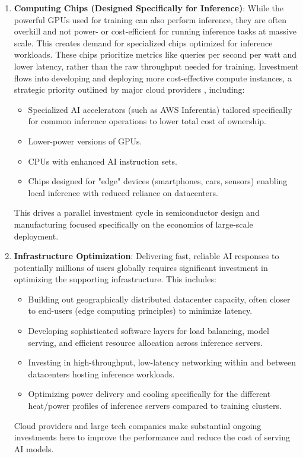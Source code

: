 \begin{enumerate}
    \item \textbf{Computing Chips (Designed Specifically for Inference)}: While the powerful GPUs used for training can also perform inference, they are often overkill and not power- or cost-efficient for running inference tasks at massive scale. This creates demand for specialized chips optimized for inference workloads. These chips prioritize metrics like queries per second per watt and lower latency, rather than the raw throughput needed for training. Investment flows into developing and deploying more cost-effective compute instances, a strategic priority outlined by major cloud providers \parencite{amazon202410k}, including:
          \begin{itemize}
              \item Specialized AI accelerators
                    (such as AWS Inferentia) tailored specifically for common inference operations to lower total cost of ownership.
              \item Lower-power versions of GPUs.
              \item CPUs with enhanced AI instruction sets.
              \item Chips designed for "edge" devices (smartphones, cars, sensors) enabling local inference with reduced reliance on datacenters.
          \end{itemize}
          This drives a parallel investment cycle in semiconductor design and manufacturing focused specifically on the economics of large-scale deployment.

    \item \textbf{Infrastructure Optimization}: Delivering fast, reliable AI responses to potentially millions of users globally requires significant investment in optimizing the supporting infrastructure. This includes:
          \begin{itemize}
              \item Building out geographically distributed datacenter capacity, often closer to end-users (edge computing principles) to minimize latency.
              \item Developing sophisticated software layers for load balancing, model serving, and efficient resource allocation across inference servers.
              \item Investing in high-throughput, low-latency networking within and between datacenters hosting inference workloads.
              \item Optimizing power delivery and cooling specifically for the different heat/power profiles of inference servers compared to training clusters.
          \end{itemize}
          Cloud providers and large tech companies make substantial ongoing investments here to improve the performance and reduce the cost of serving AI models.


\end{enumerate}
